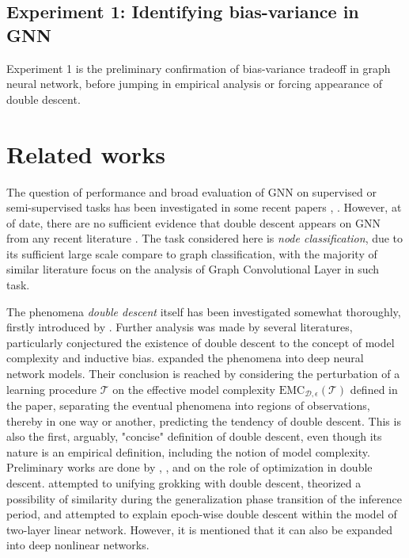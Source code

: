 \subsection{Experiment 1: Identifying bias-variance in GNN}
Experiment 1 is the preliminary confirmation of bias-variance tradeoff in graph neural network, before jumping in empirical analysis or forcing appearance of double descent. 


\section{Related works}
\begin{description}[style=unboxed,leftmargin=0cm]
    \item[Performance and Evaluation] The question of performance and broad evaluation of GNN on supervised or semi-supervised tasks has been investigated in some recent papers \cite{Oono2020Graph}, \cite{shi2024homophilymodulatesdoubledescent}. However, at of date, there are no sufficient evidence that double descent appears on GNN from any recent literature \cite{Oono2020Graph}. The task considered here is \textit{node classification}, due to its sufficient large scale compare to graph classification, with the majority of similar literature focus on the analysis of Graph Convolutional Layer in such task.  
    \item[Double descent] The phenomena \textit{double descent} itself has been investigated somewhat thoroughly, firstly introduced by \cite{belkin_reconciling_2019}. Further analysis was made by several literatures, particularly conjectured the existence of double descent to the concept of model complexity and inductive bias. \cite{nakkiran_deep_2019} expanded the phenomena into deep neural network models. Their conclusion is reached by considering the perturbation of a learning procedure $\mathcal{T}$ on the effective model complexity $\mathrm{EMC}_{\mathcal{D},\epsilon}(\mathcal{T})$ defined in the paper, separating the eventual phenomena into regions of observations, thereby in one way or another, predicting the tendency of double descent. This is also the first, arguably, "concise" definition of double descent, even though its nature is an empirical definition, including the notion of model complexity. Preliminary works are done by \cite{lafon_understanding_2024}, \cite{schaeffer_double_2023}, and \cite{liu2023understandingroleoptimizationdouble} on the role of optimization in double descent. \cite{davies_unifying_2023} attempted to unifying grokking with double descent, theorized a possibility of similarity during the generalization phase transition of the inference period, and \cite{olmin2024understandingepochwisedoubledescent} attempted to explain epoch-wise double descent within the model of two-layer linear network. However, it is mentioned that it can also be expanded into deep nonlinear networks. 

\end{description}
